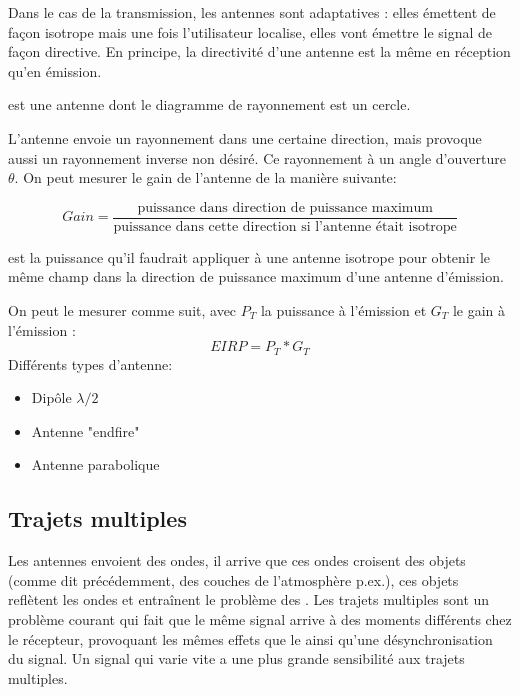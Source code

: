 Dans le cas de la transmission, les antennes sont adaptatives : elles émettent de façon isotrope mais une fois l'utilisateur localise, elles vont émettre le signal de façon directive. En principe, la directivité d'une antenne est la même en réception qu'en émission.

 est une antenne dont le diagramme de rayonnement est un cercle.


L'antenne envoie un rayonnement dans une certaine direction, mais provoque aussi un rayonnement inverse non désiré. Ce rayonnement à un angle d'ouverture $\theta$. On peut mesurer le gain de l'antenne de la manière suivante:

\begin{equation*}
Gain = \frac{\text{puissance dans direction de puissance maximum}}{\text{puissance dans cette direction si l'antenne était isotrope}}
\end{equation*}

 est la puissance qu'il faudrait appliquer à une antenne isotrope pour obtenir le même champ dans la direction de puissance maximum d'une antenne d'émission.

On peut le mesurer comme suit, avec $P_T$ la puissance à l'émission et $G_T$ le gain à l'émission :
\begin{equation*}
EIRP = P_T * G_T
\end{equation*}
Différents types d'antenne:
\begin{itemize}
\item Dipôle $\lambda/2$
\item Antenne "endfire"
\item Antenne parabolique
\end{itemize}

\subsection{Trajets multiples}

Les antennes envoient des ondes, il arrive que ces ondes croisent des objets (comme dit précédemment, des couches de l'atmosphère p.ex.), ces objets reflètent les ondes et entraînent le problème des . Les trajets multiples sont un problème courant qui fait que le même signal arrive à des moments différents chez le récepteur, provoquant les mêmes effets que le  ainsi qu'une désynchronisation du signal. Un signal qui varie vite a une plus grande sensibilité aux trajets multiples.

